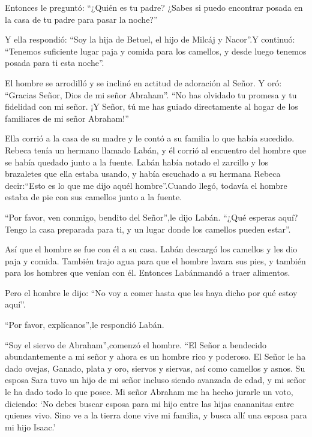  Entonces le preguntó: ``¿Quién es tu padre? ¿Sabes si
puedo encontrar posada en la casa de tu padre para pasar la noche?''

 Y ella respondió: ``Soy la hija de Betuel, el hijo de
Milcáj y Nacor''.Y continuó: ``Tenemos suficiente lugar paja y comida
para los camellos,  y desde luego tenemos posada para ti
esta noche''.

 El hombre se arrodilló y se inclinó en actitud de
adoración al Señor.  Y oró: ``Gracias Señor, Dios de mi
señor Abraham''. ``No has olvidado tu promesa y tu fidelidad con mi
señor. ¡Y Señor, tú me has guiado directamente al hogar de los
familiares de mi señor Abraham!''

 Ella corrió a la casa de su madre y le contó a su familia
lo que había sucedido.  Rebeca tenía un hermano llamado
Labán, y él corrió al encuentro del hombre que se había quedado junto a
la fuente.  Labán había notado el zarcillo y los brazaletes
que ella estaba usando, y había escuchado a su hermana Rebeca
decir:``Esto es lo que me dijo aquél hombre''.Cuando llegó, todavía el
hombre estaba de pie con sus camellos junto a la fuente.

 ``Por favor, ven conmigo, bendito del Señor'',le dijo
Labán. ``¿Qué esperas aquí? Tengo la casa preparada para ti, y un lugar
donde los camellos pueden estar''.

 Así que el hombre se fue con él a su casa. Labán descargó
los camellos y les dio paja y comida. También trajo agua para que el
hombre lavara sus pies, y también para los hombres que venían con él.
 Entonces Labánmandó a traer alimentos.

Pero el hombre le dijo: ``No voy a comer hasta que les haya dicho por
qué estoy aquí''.

``Por favor, explícanos'',le respondió Labán.

 ``Soy el siervo de Abraham'',comenzó el hombre.
 ``El Señor a bendecido abundantemente a mi señor y ahora
es un hombre rico y poderoso. El Señor le ha dado ovejas, Ganado, plata
y oro, siervos y siervas, así como camellos y asnos.  Su
esposa Sara tuvo un hijo de mi señor incluso siendo avanzada de edad, y
mi señor le ha dado todo lo que posee.  Mi señor Abraham me
ha hecho jurarle un voto, diciendo: `No debes buscar esposa para mi hijo
entre las hijas caananitas entre quienes vivo.  Sino ve a
la tierra done vive mi familia, y busca allí una esposa para mi hijo
Isaac.'

